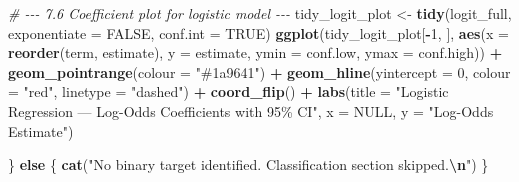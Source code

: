 \documentclass[
]{article}
\newenvironment{Shaded}{\begin{snugshade}}{\end{snugshade}}
\newcommand{\AttributeTok}[1]{\textcolor[rgb]{0.13,0.29,0.53}{#1}}
\newcommand{\CommentTok}[1]{\textcolor[rgb]{0.56,0.35,0.01}{\textit{#1}}}
\newcommand{\ConstantTok}[1]{\textcolor[rgb]{0.56,0.35,0.01}{#1}}
\newcommand{\ControlFlowTok}[1]{\textcolor[rgb]{0.13,0.29,0.53}{\textbf{#1}}}
\newcommand{\DecValTok}[1]{\textcolor[rgb]{0.00,0.00,0.81}{#1}}
\newcommand{\FunctionTok}[1]{\textcolor[rgb]{0.13,0.29,0.53}{\textbf{#1}}}
\newcommand{\NormalTok}[1]{#1}
\newcommand{\OtherTok}[1]{\textcolor[rgb]{0.56,0.35,0.01}{#1}}
\newcommand{\SpecialCharTok}[1]{\textcolor[rgb]{0.81,0.36,0.00}{\textbf{#1}}}
\newcommand{\StringTok}[1]{\textcolor[rgb]{0.31,0.60,0.02}{#1}}
\begin{document}
\begin{Shaded}
\begin{Highlighting}[]
  \CommentTok{\# {-}{-}{-} 7.6  Coefficient plot for logistic model {-}{-}{-}}
\NormalTok{  tidy\_logit\_plot }\OtherTok{\textless{}{-}} \FunctionTok{tidy}\NormalTok{(logit\_full, }\AttributeTok{exponentiate =} \ConstantTok{FALSE}\NormalTok{, }\AttributeTok{conf.int =} \ConstantTok{TRUE}\NormalTok{)}
  \FunctionTok{ggplot}\NormalTok{(tidy\_logit\_plot[}\SpecialCharTok{{-}}\DecValTok{1}\NormalTok{, ], }\FunctionTok{aes}\NormalTok{(}\AttributeTok{x =} \FunctionTok{reorder}\NormalTok{(term, estimate),}
                                     \AttributeTok{y =}\NormalTok{ estimate,}
                                     \AttributeTok{ymin =}\NormalTok{ conf.low, }\AttributeTok{ymax =}\NormalTok{ conf.high)) }\SpecialCharTok{+}
    \FunctionTok{geom\_pointrange}\NormalTok{(}\AttributeTok{colour =} \StringTok{"\#1a9641"}\NormalTok{) }\SpecialCharTok{+}
    \FunctionTok{geom\_hline}\NormalTok{(}\AttributeTok{yintercept =} \DecValTok{0}\NormalTok{, }\AttributeTok{colour =} \StringTok{"red"}\NormalTok{, }\AttributeTok{linetype =} \StringTok{"dashed"}\NormalTok{) }\SpecialCharTok{+}
    \FunctionTok{coord\_flip}\NormalTok{() }\SpecialCharTok{+}
    \FunctionTok{labs}\NormalTok{(}\AttributeTok{title =} \StringTok{"Logistic Regression — Log{-}Odds Coefficients with 95\% CI"}\NormalTok{,}
         \AttributeTok{x =} \ConstantTok{NULL}\NormalTok{, }\AttributeTok{y =} \StringTok{"Log{-}Odds Estimate"}\NormalTok{)}

\NormalTok{\} }\ControlFlowTok{else}\NormalTok{ \{}
  \FunctionTok{cat}\NormalTok{(}\StringTok{"No binary target identified. Classification section skipped.}\SpecialCharTok{\textbackslash{}n}\StringTok{"}\NormalTok{)}
\NormalTok{\}}
\end{Highlighting}
\end{Shaded}
\end{document}
